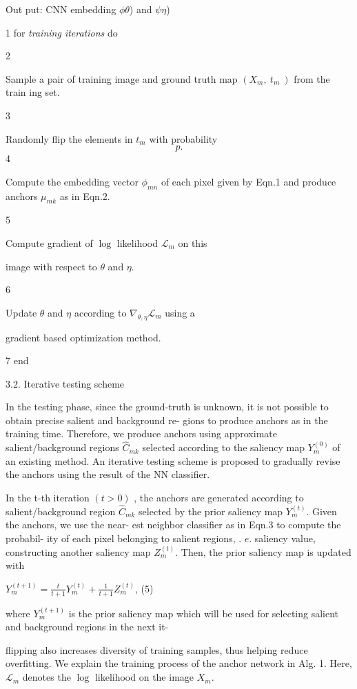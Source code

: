 \documentclass[a4paper,10pt]{article}
\begin{document}
Out put: CN$\mathrm{N}$ embedding $\phi \theta$) and $\psi \eta$)

1 for {\it training iterations} do

2

Sample a pair of training image and ground truth map $(X_{m},\ t_{m}\ )$ from the train ing set.

3

Randomly flip the elements in $t_{m}$ with probability
$$
p.
$$
4

Compute the embedding vector $\phi_{mn}$ of each pixel given by Eqn.1 and produce anchors $\mu_{mk}$ as in Eqn.2.

5

Compute gradient of $\log$ likelihood $\mathcal{L}_{m}$ on this

image with respect to $\theta$ and $\eta.$

6

Update $\theta$ and $\eta$ according to $\nabla_{\theta,\eta}\mathcal{L}_{m}$ using a

gradient based optimization method.

7 end

3.2. Iterative testing scheme

In the testing phase, since the ground-truth is unknown, it is not possible to obtain precise salient and background re- gions to produce anchors as in the training time. Therefore, we produce anchors using approximate salient/background regions $\hat{C}_{mk}$ selected according to the saliency map $Y_{m}^{(0)}$ of an existing method. An iterative testing scheme is proposed to gradually revise the anchors using the result of the NN classifier.

In the t-th iteration $(t>0)$ , the anchors are generated according to salient/background region $\hat{C}_{mk}$ selected by the prior saliency map $Y_{m}^{(t)}$. Given the anchors, we use the near- est neighbor classifier as in Eqn.3 to compute the probabil- ity of each pixel belonging to salient regions, . $e$. saliency value, constructing another saliency map $Z_{m}^{(t)}$. Then, the prior saliency map is updated with

$Y_{m}^{(t+1)}=\displaystyle \frac{t}{t+1}Y_{m}^{(t)}+\frac{1}{t+1}Z_{m}^{(t)}$, (5)

where $Y_{m}^{(t+1)}$ is the prior saliency map which will be used for selecting salient and background regions in the next it-

flipping also increases diversity of training samples, thus helping reduce overfitting. We explain the training process of the anchor network in Alg. 1. Here, $\mathcal{L}_{m}$ denotes the $\log$ likelihood on the image $X_{m}.$
\end{document}
